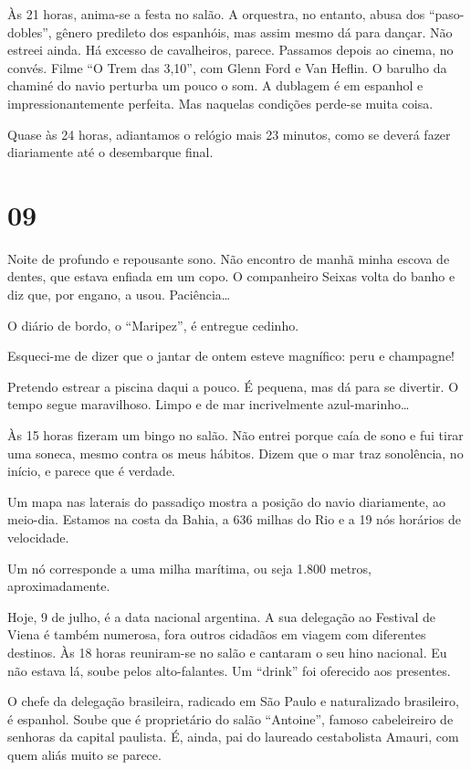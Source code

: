 Às 21 horas, anima-se a festa no salão. A orquestra, no entanto, abusa dos ``paso-dobles'', gênero predileto dos espanhóis, mas assim mesmo dá para dançar. Não estreei ainda. Há excesso de cavalheiros, parece. Passamos depois ao cinema, no convés. Filme ``O Trem das 3,10'', com Glenn Ford e Van Heflin. O barulho da chaminé do navio perturba um pouco o som. A dublagem é em espanhol e impressionantemente perfeita. Mas naquelas condições perde-se muita coisa.

Quase às 24 horas, adiantamos o relógio mais 23 minutos, como se deverá fazer diariamente até o desembarque final.

\section*{09 \adfflatleafright {}}

Noite de profundo e repousante sono. Não encontro de manhã minha escova de dentes, que estava enfiada em um copo. O companheiro Seixas volta do banho e diz que, por engano, a usou. Paciência\ldots

O diário de bordo, o ``Maripez'', é entregue cedinho.

Esqueci-me de dizer que o jantar de ontem esteve magnífico: peru e champagne!

Pretendo estrear a piscina daqui a pouco. É pequena, mas dá para se divertir. O tempo segue maravilhoso. Limpo e de mar incrivelmente azul-marinho\ldots

Às 15 horas fizeram um bingo no salão. Não entrei porque caía de sono e fui tirar uma soneca, mesmo contra os meus hábitos. Dizem que o mar traz sonolência, no início, e parece que é verdade.

Um mapa nas laterais do passadiço mostra a posição do navio diariamente, ao meio-dia. Estamos na costa da Bahia, a 636 milhas do Rio e a 19 nós horários de velocidade.

Um nó corresponde a uma milha marítima, ou seja 1.800 metros, aproximadamente.

Hoje, 9 de julho, é a data nacional argentina. A sua delegação ao Festival de Viena é também numerosa, fora outros cidadãos em viagem com diferentes destinos. Às 18 horas reuniram-se no salão e cantaram o seu hino nacional. Eu não estava lá, soube pelos alto-falantes. Um ``drink'' foi oferecido aos presentes.

O chefe da delegação brasileira, radicado em São Paulo e naturalizado brasileiro, é espanhol. Soube que é proprietário do salão ``Antoine'', famoso cabeleireiro de senhoras da capital paulista. É, ainda, pai do laureado cestabolista Amauri, com quem aliás muito se parece.


